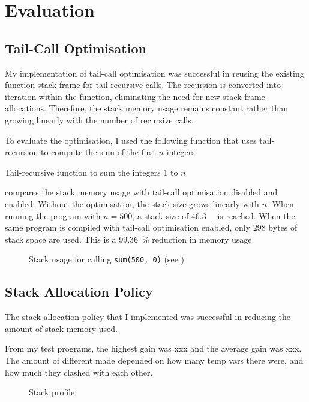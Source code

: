 \documentclass[00-main.tex]{subfiles}
\begin{document}
\chapter{Evaluation}

\newcommand{\stackplot}[1]{\fbox{\resizebox{\textwidth}{!}{}}}

\section{Tail-Call Optimisation}

My implementation of tail-call optimisation was successful in reusing the existing function stack frame for tail-recursive calls. The recursion is converted into iteration within the function, eliminating the need for new stack frame allocations.
Therefore, the stack memory usage remains constant rather than growing linearly with the number of recursive calls.

To evaluate the optimisation, I used the following function that uses tail-recursion to compute the sum of the first $n$ integers.

\begin{listing}[H]
  \caption{Tail-recursive function to sum the integers 1 to $n$}
  \label{lst:tail-recursive sum}
\end{listing}


 compares the stack memory usage with tail-call optimisation disabled and enabled.
Without the optimisation, the stack size grows linearly with $n$.
When running the program with $n=500$, a stack size of \SI{46.3}{\kilo\byte} is reached.
When the same program is compiled with tail-call optimisation enabled, only 298 bytes of stack space are used.
This is a \SI{99.36}{\percent} reduction in memory usage.

\begin{figure}[h]
  \centering
  \stackplot{22-tailcall-sum-compare-tailcallopt-without-stackopt.pgf}
  \caption{Stack usage for calling \texttt{sum(500, 0)} (see )}
  \label{fig:plot:tail-call optimisation stack use}
\end{figure}

\section{Stack Allocation Policy}

The stack allocation policy that I implemented was successful in reducing the amount of stack memory used.

From my test programs, the highest gain was xxx and the average gain was xxx.
The amount of different made depended on how many temp vars there were, and how much they clashed with each other.

\begin{figure}[h]
  \centering
  \stackplot{01-case-compare.pgf}
  \caption{Stack profile}
  \label{fig:}
\end{figure}
\end{document}
